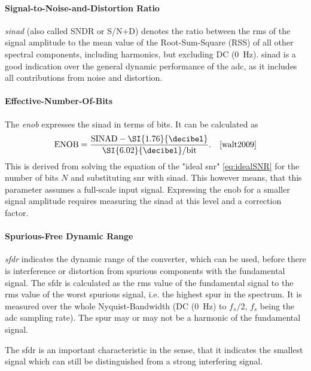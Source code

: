 \paragraph{Signal-to-Noise-and-Distortion Ratio}
\textit{\gls{sinad}} (also called SNDR or S/N+D) denotes the ratio between the \gls{rms} of the signal amplitude to the mean value of the Root-Sum-Square (RSS) of all other spectral components, including harmonics, but excluding  DC (\SI{0}{\hertz}). \gls{sinad} is a good indication over the general dynamic performance of the \gls{adc}, as it includes all contributions from noise and distortion.

\paragraph{Effective-Number-Of-Bits}
The \textit{\gls{enob}} expresses the \gls{sinad} in terms of bits. It can be calculated as
\begin{equation}
	\text{ENOB} = \frac{\text{SINAD}-\SI{1.76}{\decibel}}{\SI{6.02}{\decibel}/\text{bit}}. \quad \cite{walt2009}
\end{equation}
This is derived from solving the equation of the "ideal \gls{snr}" \autoref{eq:idealSNR} for the number of bits $N$ and substituting \gls{snr} with \gls{sinad}. This however means, that this parameter assumes a full-scale input signal. Expressing the \gls{enob} for a smaller signal amplitude requires measuring the \gls{sinad} at this level and a correction factor. \cite{walt}

\paragraph{Spurious-Free Dynamic Range}
\textit{\gls{sfdr}} indicates the dynamic range of the converter, which can be used, before there is interference or distortion from spurious components with the fundamental signal. \cite{Lundberg} The \gls{sfdr} is calculated as the \gls{rms} value of the fundamental signal to the \gls{rms} value of the worst spurious signal, i.e. the highest spur in the spectrum. It is measured over the whole Nyquist-Bandwidth (DC (\SI{0}{\hertz}) to $f_s/2$, $f_s$ being the \gls{adc} sampling rate). The spur may or may not be a harmonic of the fundamental signal. \cite{walt2009} \cite{Lundberg}

The \gls{sfdr} is an important characteristic in the sense, that it indicates the smallest signal which can still be distinguished from a strong interfering signal. \cite{walt2009} 

